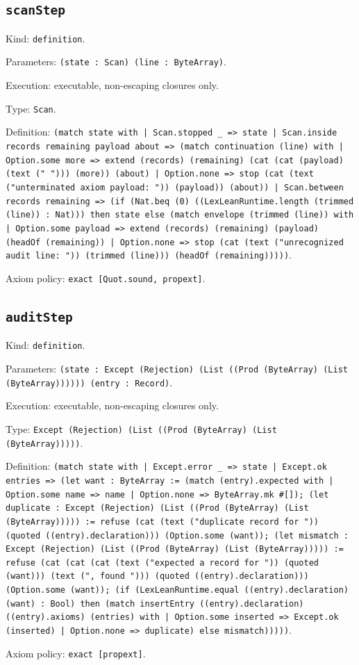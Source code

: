 \documentclass[11pt]{article}
\begin{document}
\subsection*{\texttt{scanStep}}
\noindent Kind: \texttt{definition}.\par
\noindent Parameters: \texttt{(state : Scan) (line : ByteArray)}.\par
\noindent Execution: executable, non-escaping closures only.\par
\noindent Type: \texttt{Scan}.\par
\noindent Definition: \texttt{(match state with | Scan.stopped \_ => state | Scan.inside records remaining payload about => (match continuation (line) with | Option.some more => extend (records) (remaining) (cat (cat (payload) (text (" "))) (more)) (about) | Option.none => stop (cat (text ("unterminated axiom payload: ")) (payload)) (about)) | Scan.between records remaining => (if (Nat.beq (0) ((LexLeanRuntime.length (trimmed (line)) : Nat))) then state else (match envelope (trimmed (line)) with | Option.some payload => extend (records) (remaining) (payload) (headOf (remaining)) | Option.none => stop (cat (text ("unrecognized audit line: ")) (trimmed (line))) (headOf (remaining)))))}.\par
\noindent Axiom policy: \texttt{exact [Quot.sound, propext]}.\par
\subsection*{\texttt{auditStep}}
\noindent Kind: \texttt{definition}.\par
\noindent Parameters: \texttt{(state : Except (Rejection) (List ((Prod (ByteArray) (List (ByteArray)))))) (entry : Record)}.\par
\noindent Execution: executable, non-escaping closures only.\par
\noindent Type: \texttt{Except (Rejection) (List ((Prod (ByteArray) (List (ByteArray)))))}.\par
\noindent Definition: \texttt{(match state with | Except.error \_ => state | Except.ok entries => (let want : ByteArray := (match (entry).expected with | Option.some name => name | Option.none => ByteArray.mk \#[]); (let duplicate : Except (Rejection) (List ((Prod (ByteArray) (List (ByteArray))))) := refuse (cat (text ("duplicate record for ")) (quoted ((entry).declaration))) (Option.some (want)); (let mismatch : Except (Rejection) (List ((Prod (ByteArray) (List (ByteArray))))) := refuse (cat (cat (cat (text ("expected a record for ")) (quoted (want))) (text (", found "))) (quoted ((entry).declaration))) (Option.some (want)); (if (LexLeanRuntime.equal ((entry).declaration) (want) : Bool) then (match insertEntry ((entry).declaration) ((entry).axioms) (entries) with | Option.some inserted => Except.ok (inserted) | Option.none => duplicate) else mismatch)))))}.\par
\noindent Axiom policy: \texttt{exact [propext]}.\par
\end{document}
